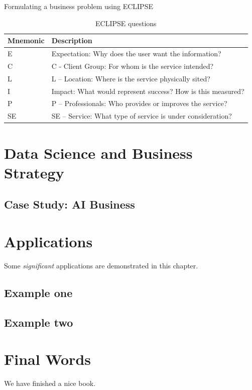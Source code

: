 \documentclass[
]{book}
\begin{document}
Formulating a business problem using ECLIPSE \citep{wildridge_eclipse_2002}

\begin{longtable}[t]{ll}
\caption{\label{tab:unnamed-chunk-2}ECLIPSE questions}\\
\toprule
Mnemonic & Description\\
\midrule
E & Expectation: Why does the user want the information?\\
C & C - Client Group: For whom is the service intended?\\
L & L –   Location:  Where is the service physically sited?\\
I & Impact: What would represent success?  How is this measured?\\
P & P –   Professionals: Who provides or improves the service?\\
\addlinespace
SE & SE – Service: What type of service is under consideration?\\
\bottomrule
\end{longtable}

\hypertarget{businessstrategy}{%
\chapter{Data Science and Business Strategy}\label{businessstrategy}}

\hypertarget{case-study-ai-business}{%
\section{Case Study: AI Business}\label{case-study-ai-business}}

\hypertarget{applications}{%
\chapter{Applications}\label{applications}}

Some \emph{significant} applications are demonstrated in this chapter.

\hypertarget{example-one}{%
\section{Example one}\label{example-one}}

\hypertarget{example-two}{%
\section{Example two}\label{example-two}}

\hypertarget{final-words}{%
\chapter{Final Words}\label{final-words}}

We have finished a nice book.

  
\end{document}

